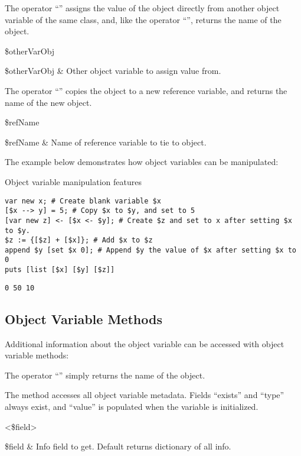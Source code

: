 \documentclass{article}
\begin{document}
The operator ``\texttt{}'' assigns the value of the object directly from another object variable of the same class, and, like the operator  ``\texttt{}'', returns the name of the object.
\begin{syntax}
 \$otherVarObj 
\end{syntax}
\begin{args}
\$otherVarObj & Other object variable to assign value from.
\end{args}
The operator ``\texttt{}'' copies the object to a new reference variable, and returns the name of the new object.
\begin{syntax}
 \$refName
\end{syntax}
\begin{args}
\$refName & Name of reference variable to tie to object. 
\end{args}

The example below demonstrates how object variables can be manipulated:

\begin{example}{Object variable manipulation features}
\begin{lstlisting}
var new x; # Create blank variable $x
[$x --> y] = 5; # Copy $x to $y, and set to 5
[var new z] <- [$x <- $y]; # Create $z and set to x after setting $x to $y.
$z := {[$z] + [$x]}; # Add $x to $z
append $y [set $x 0]; # Append $y the value of $x after setting $x to 0
puts [list [$x] [$y] [$z]]
\end{lstlisting}
\tcblower
\begin{lstlisting}
0 50 10
\end{lstlisting}
\end{example}

\clearpage
\subsection{Object Variable Methods}
Additional information about the object variable can be accessed with object variable methods:

The operator ``\textbf{\texttt{}}'' simply returns the name of the object.
\begin{syntax}
\end{syntax}

The method  accesses all object variable metadata. 
Fields ``exists'' and ``type'' always exist, and ``value'' is populated when the variable is initialized.
\begin{syntax}
 <\$field>
\end{syntax}
\begin{args}
\$field & Info field to get. Default returns dictionary of all info. \\
\end{args}
\end{document}
